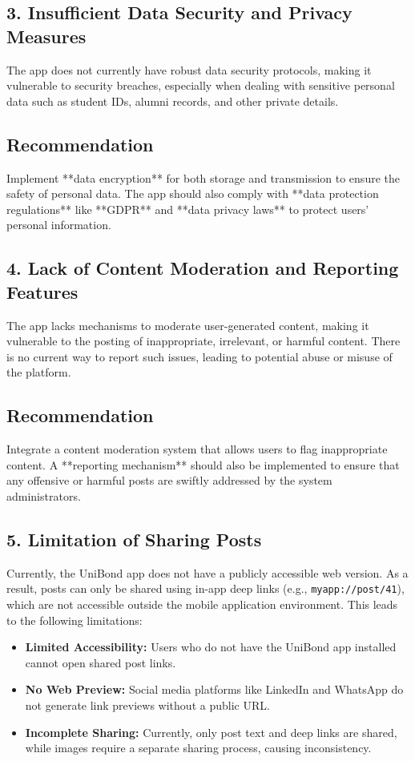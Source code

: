 \documentclass[12pt, a4paper]{report}
\begin{document}
\subsection*{3. Insufficient Data Security and Privacy Measures}
The app does not currently have robust data security protocols, making it vulnerable to security breaches, especially when dealing with sensitive personal data such as student IDs, alumni records, and other private details.

\subsection*{Recommendation}
Implement **data encryption** for both storage and transmission to ensure the safety of personal data. The app should also comply with **data protection regulations** like **GDPR** and **data privacy laws** to protect users' personal information.

\subsection*{4. Lack of Content Moderation and Reporting Features}
The app lacks mechanisms to moderate user-generated content, making it vulnerable to the posting of inappropriate, irrelevant, or harmful content. There is no current way to report such issues, leading to potential abuse or misuse of the platform.

\subsection*{Recommendation}
Integrate a content moderation system that allows users to flag inappropriate content. A **reporting mechanism** should also be implemented to ensure that any offensive or harmful posts are swiftly addressed by the system administrators.

\subsection*{5. Limitation of Sharing Posts}
Currently, the UniBond app does not have a publicly accessible web version. As a result, posts can only be shared using in-app deep links (e.g., \texttt{myapp://post/41}), which are not accessible outside the mobile application environment. This leads to the following limitations:

\begin{itemize}
    \item \textbf{Limited Accessibility:} Users who do not have the UniBond app installed cannot open shared post links.
    \item \textbf{No Web Preview:} Social media platforms like LinkedIn and WhatsApp do not generate link previews without a public URL.
    \item \textbf{Incomplete Sharing:} Currently, only post text and deep links are shared, while images require a separate sharing process, causing inconsistency.
\end{itemize}
\end{document}
